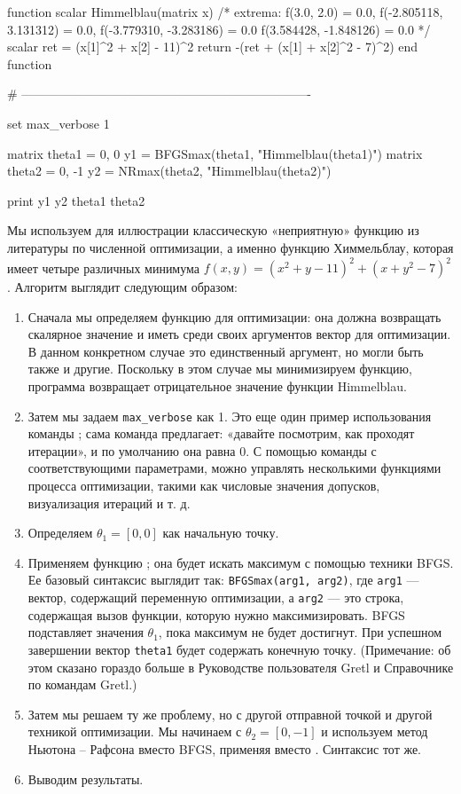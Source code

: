 \begin{code}
function scalar Himmelblau(matrix x)
    /* extrema:
    f(3.0, 2.0) = 0.0, 
    f(-2.805118, 3.131312) = 0.0,
    f(-3.779310, -3.283186) = 0.0
    f(3.584428, -1.848126) = 0.0
    */
    scalar ret = (x[1]^2 + x[2] - 11)^2
    return -(ret + (x[1] + x[2]^2 - 7)^2)
end function

# ----------------------------------------------------------------------

set max_verbose 1

matrix theta1 = { 0, 0 }
y1 = BFGSmax(theta1, "Himmelblau(theta1)")
matrix theta2 = { 0, -1 }
y2 = NRmax(theta2, "Himmelblau(theta2)")

print y1 y2 theta1 theta2
\end{code}
Мы используем для иллюстрации классическую «неприятную» функцию из
литературы по численной оптимизации, а именно функцию Химмельблау,
которая имеет четыре различных минимума
$f(x, y) = (x^2+y-11)^2 + (x+y^2-7)^2$. Алгоритм выглядит следующим
образом:

\begin{enumerate}
\item Сначала мы определяем функцию для оптимизации: она должна
  возвращать скалярное значение и иметь среди своих аргументов вектор
  для оптимизации. В данном конкретном случае это единственный
  аргумент, но могли быть также и другие. Поскольку в этом случае мы
  минимизируем функцию, программа возвращает отрицательное значение
  функции Himmelblau.
\item Затем мы задаем \verb|max_verbose| как 1. Это еще один пример
  использования команды  ; сама команда предлагает: «давайте
  посмотрим, как проходят итерации», и по умолчанию она равна 0. С
  помощью команды  с соответствующими параметрами, можно
  управлять несколькими функциями процесса оптимизации, такими как
  числовые значения допусков, визуализация итераций и т. д.
\item Определяем $\theta_1 = [0, 0]$ как начальную точку.
\item Применяем функцию ; она будет искать максимум с
  помощью техники BFGS. Ее базовый синтаксис выглядит так:
  \texttt{BFGSmax(arg1, arg2)}, где \texttt{arg1} --- вектор,
  содержащий переменную оптимизации, а \texttt{arg2} --- это строка,
  содержащая вызов функции, которую нужно максимизировать. BFGS
  подставляет значения $\theta_1$, пока максимум не будет
  достигнут. При успешном завершении вектор \texttt{theta1} будет
  содержать конечную точку. (Примечание: об этом сказано гораздо
  больше в Руководстве пользователя Gretl и Справочнике по командам
  Gretl.)
\item Затем мы решаем ту же проблему, но с другой отправной точкой и
  другой техникой оптимизации. Мы начинаем с $\theta_2 = [0, -1]$ и
  используем метод Ньютона – Рафсона вместо BFGS, применяя
   вместо . Синтаксис тот же.
\item Выводим результаты.
\end{enumerate}

